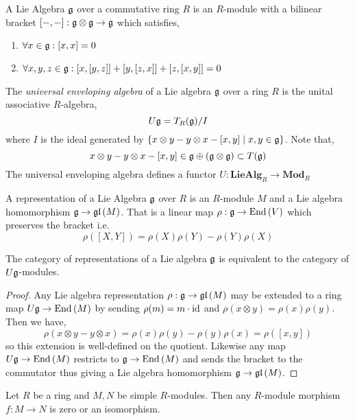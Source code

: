 \documentclass[12pt]{article}
\begin{document}
\begin{definition}
A Lie Algebra $\mathfrak{g}$ over a commutative ring $R$ is an $R$-module with a bilinear bracket $[-,-] : \mathfrak{g} \otimes \mathfrak{g} \to \mathfrak{g}$ which satisfies,
\begin{enumerate}
\item $\forall x \in \mathfrak{g} : [x,x] = 0$
\item $\forall x,y,z \in \mathfrak{g} : [x, [y,z]] + [y, [z,x]] + [z, [x, y]] = 0$
\end{enumerate}
\end{definition}

\begin{definition}
The \textit{universal enveloping algebra} of a Lie algebra $\mathfrak{g}$ over a ring $R$ is the unital associative $R$-algebra,
\[ U \mathfrak{g} = T_R(\mathfrak{g}) / I \]
where $I$ is the ideal generated by $\{ x \otimes y - y \otimes x - [x, y] \mid x,y \in \mathfrak{g} \}$. Note that,
\[ x \otimes y - y \otimes x - [x, y] \in \mathfrak{g} \oplus (\mathfrak{g} \otimes \mathfrak{g}) \subset T(\mathfrak{g}) \]
The universal enveloping algebra defines a functor $U : \mathbf{LieAlg}_R \to \mathbf{Mod}_R$ 
\end{definition}

\begin{definition}
A representation of a  Lie Algebra $\mathfrak{g}$ over $R$ is an $R$-module $M$ and a Lie algebra homomorphism $\mathfrak{g} \to \mathfrak{gl}\left( M \right)$. That is a linear map $\rho : \mathfrak{g} \to \mathrm{End} \left( V \right)$ which preserves the bracket i.e.
\[ \rho([X, Y]) = \rho(X) \rho(Y) - \rho(Y) \rho(X) \]
\end{definition}


\begin{proposition}
The category of representations of a Lie algebra $\mathfrak{g}$ is equivalent to  the category of $U \mathfrak{g}$-modules. 
\end{proposition}

\begin{proof}
Any Lie algebra representation $\rho : \mathfrak{g} \to \mathfrak{gl}\left( M \right)$ may be extended to a ring map $U \mathfrak{g} \to \mathrm{End} \left( M \right)$ by sending $\rho(m) = m \cdot \mathrm{id}$ and $\rho(x \otimes y) = \rho(x) \rho(y)$. Then we have,
\[ \rho(x \otimes y - y \otimes x) = \rho(x) \rho(y) - \rho(y) \rho(x) = \rho([x, y]) \]
so this extension is well-defined on the quotient. Likewise any map $U \mathfrak{g} \to \mathrm{End} \left( M \right)$ restricts to $\mathfrak{g} \to \mathrm{End} \left( M \right)$ and sends the bracket to the commutator thus giving a Lie algebra homomorphism $\mathfrak{g} \to \mathfrak{gl}\left( M \right)$.
\end{proof}

\begin{lemma}
Let $R$ be a ring and $M, N$ be simple $R$-modules. Then any $R$-module morphism $f : M \to N$ is zero or an isomorphism.
\end{lemma}
\end{document}
